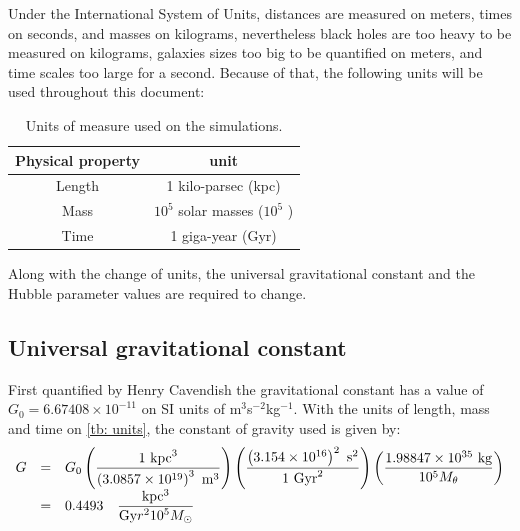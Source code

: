 		Under the International System of Units, distances are measured on meters, times on seconds, and masses on kilograms, nevertheless black holes are too heavy to be measured on kilograms, galaxies sizes too big to be quantified on meters, and time scales too large for a second. Because of that, the following units will be used throughout this document:
		\begin{table}[h]
			\centering
			\caption{Units of measure used on the simulations.}
			\label{tb: units}
			\begin{tabular}{c|c}
				\hline
				\textbf{Physical property} & \textbf{unit} \\
				\hline
				Length & 1 kilo-parsec (kpc) \\
				Mass & $10^5$ solar masses ($10^5$ \sm) \\
				Time & 1 giga-year (Gyr) \\
				\hline
			\end{tabular}
		\end{table}
	
		Along with the change of units, the universal gravitational constant and the Hubble parameter values are required to change.
		
		\subsection{Universal gravitational constant}
			First quantified by Henry Cavendish the gravitational constant has a value of $G_0 = 6.67408\times10^{-11}$ on SI units of m$^3$s$^{-2}$kg$^{-1}$. With the units of length, mass and time on \autoref{tb: units}, the constant of gravity used is given by:
			\begin{equation}
				\begin{array}{ccl}
					G & = & G_0 \left(\dfrac{1 \text{ kpc}^3}{\left(3.0857\times10^{19}\right)^3  \text{ m}^3}\right)\left(\dfrac{\left(3.154\times10^{16}\right)^2 \text{ s}^2}{1 \text{ Gyr}^2}\right)\left(\dfrac{1.98847\times10^{35} \text{ kg}}{10^5 M_\theta}\right) \\
					& = & 0.4493 \quad \dfrac{\text{kpc$^3$}}{\text{Gy$r^210^5$$M_\odot$}}	
				\end{array}
			\end{equation}
				
		
